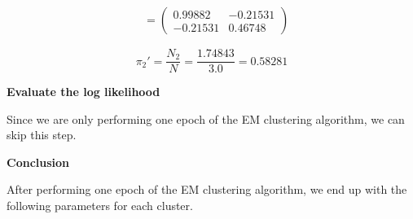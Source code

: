 \documentclass[12pt]{article}
\begin{document}
\begin{enumerate}[leftmargin=\labelsep]
\begin{paracol}{2}
\begin{footnotesize}
$$\begin{aligned}
                                       & = \begin{pmatrix}{}
                                               0.99882  & -0.21531 \\
                                               -0.21531 & 0.46748
                                           \end{pmatrix}
                      \end{aligned}
                  $$
              \end{footnotesize}
              $$
                  \pi_2' = \frac{N_2}{N} = \frac{1.74843}{3.0} = 0.58281
              $$

          \end{paracol}

          \vspace*{0.5cm}

          \textbf{Evaluate the log likelihood}

          Since we are only performing one epoch of the EM clustering algorithm,
          we can skip this step.

          \vspace*{1.0cm}

          \textbf{Conclusion}

          After performing one epoch of the EM clustering algorithm, we end
          up with the following parameters for each cluster.


\end{enumerate}
\end{document}

